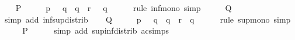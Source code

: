 \begin{isabellebody}
%
\isatagproof
{}\isamarkupfalse%
\isanewline
\ \ \isamarkupfalse%
\ {\isacharquery}{\kern0pt}P\isanewline
\ \ \isamarkupfalse%
\ \isamarkupfalse%
\ {\isacartoucheopen}p\ {\isasymsqinter}\ {\isacharminus}{\kern0pt}\ q\ {\isasymle}\ {\isacharparenleft}{\kern0pt}q\ {\isasymsqunion}\ r{\isacharparenright}{\kern0pt}\ {\isasymsqinter}\ {\isacharminus}{\kern0pt}\ q{\isacartoucheclose}\isanewline
\ \ \ \ \isamarkupfalse%
\ {\isacharparenleft}{\kern0pt}rule\ inf{\isacharunderscore}{\kern0pt}mono{\isacharparenright}{\kern0pt}\ simp\isanewline
\ \ \isamarkupfalse%
\ \isamarkupfalse%
\ {\isacharquery}{\kern0pt}Q\isanewline
\ \ \ \ \isamarkupfalse%
\ {\isacharparenleft}{\kern0pt}simp\ add{\isacharcolon}{\kern0pt}\ inf{\isacharunderscore}{\kern0pt}sup{\isacharunderscore}{\kern0pt}distrib{}{\isacharparenright}{\kern0pt}\isanewline
{}\isamarkupfalse%
\isanewline
\ \ \isamarkupfalse%
\ {\isacharquery}{\kern0pt}Q\isanewline
\ \ \isamarkupfalse%
\ \isamarkupfalse%
\ {\isacartoucheopen}p\ {\isasymsqinter}\ {\isacharminus}{\kern0pt}\ q\ {\isasymsqunion}\ q\ {\isasymle}\ r\ {\isasymsqunion}\ q{\isacartoucheclose}\isanewline
\ \ \ \ \isamarkupfalse%
\ {\isacharparenleft}{\kern0pt}rule\ sup{\isacharunderscore}{\kern0pt}mono{\isacharparenright}{\kern0pt}\ simp\isanewline
\ \ \isamarkupfalse%
\ \isamarkupfalse%
\ {\isacharquery}{\kern0pt}P\isanewline
\ \ \ \ \isamarkupfalse%
\ {\isacharparenleft}{\kern0pt}simp\ add{\isacharcolon}{\kern0pt}\ sup{\isacharunderscore}{\kern0pt}inf{\isacharunderscore}{\kern0pt}distrib\ ac{\isacharunderscore}{\kern0pt}simps{\isacharparenright}{\kern0pt}\isanewline
{}\isamarkupfalse%
%
\endisatagproof
{\isafoldproof}%
%
\isadelimproof
\isanewline
%
\endisadelimproof
\isanewline
{}\isamarkupfalse%
\isanewline
%
\isadelimtheory
\isanewline
%
\endisadelimtheory
%
\isatagtheory
{}\isamarkupfalse%
%
\endisatagtheory
{\isafoldtheory}%
%
\isadelimtheory
%
\endisadelimtheory
%
\end{isabellebody}%
\endinput
